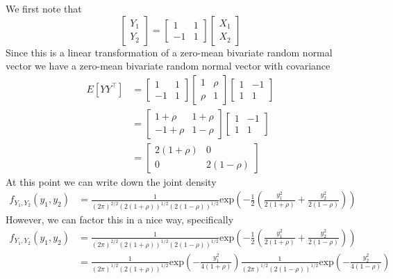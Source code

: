 \documentclass[a4paper]{article}
\begin{document}
We first note that 
\[
  \begin{bmatrix}
    Y_1 \\
    Y_2
  \end{bmatrix}
  =
  \begin{bmatrix}
    1 & 1 \\
    -1 & 1
  \end{bmatrix}
  \begin{bmatrix}
    X_1 \\
    X_2
  \end{bmatrix}
\]
Since this is a linear transformation of a zero-mean bivariate random normal vector we have a zero-mean bivariate random normal vector with covariance
\[
  \begin{aligned}
  E \left[ YY^\top \right] &= 
  \begin{bmatrix}
    1 & 1 \\
    -1 & 1
  \end{bmatrix}
  \begin{bmatrix}
    1 & \rho \\
    \rho & 1
  \end{bmatrix}
  \begin{bmatrix}
    1 & -1 \\
    1 & 1
  \end{bmatrix} \\
                           &=
   \begin{bmatrix}
     1 + \rho & 1 + \rho \\
     -1 + \rho & 1 - \rho
   \end{bmatrix}
  \begin{bmatrix}
    1 & -1 \\
    1 & 1
  \end{bmatrix} \\
                           &=
   \begin{bmatrix}
     2(1 + \rho) & 0 \\
     0 & 2(1 - \rho)
   \end{bmatrix}
  \end{aligned}
\]
At this point we can write down the joint density
\[
  \begin{aligned}
    f_{Y_1,Y_2}(y_1, y_2) &=  \frac{1}{(2\pi)^{2/2} (2(1+\rho))^{1/2}(2(1-\rho))^{1/2}} \text{exp} \left(-\frac{1}{2} \left( \frac{y_1^2}{2(1+\rho)} + \frac{y_2^2}{2(1-\rho)} \right)  \right)
  \end{aligned}
\]
However, we can factor this in a nice way, specifically
\[
  \begin{aligned}
    f_{Y_1,Y_2}(y_1, y_2) &=  \frac{1}{(2\pi)^{2/2} (2(1+\rho))^{1/2}(2(1-\rho))^{1/2}} \text{exp} \left(-\frac{1}{2} \left( \frac{y_1^2}{2(1+\rho)} + \frac{y_2^2}{2(1-\rho)} \right)  \right) \\
                          &= \frac{1}{(2\pi)^{1/2} (2(1+\rho))^{1/2}} \text{exp}\left(-\frac{y_1^2}{4(1 + \rho)}\right) \frac{1}{(2\pi)^{1/2} (2(1-\rho))^{1/2}} \text{exp}\left(-\frac{y_2^2}{4(1 - \rho)}\right) 
  \end{aligned}
\]
\end{document}
